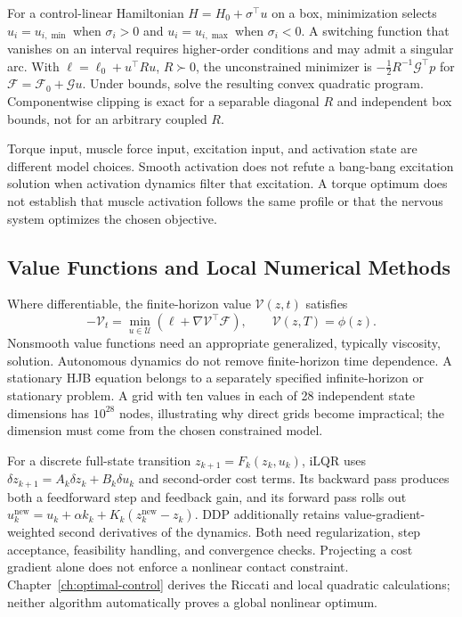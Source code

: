 For a control-linear Hamiltonian $H=H_0+\sigma^\top u$ on a box, minimization selects $u_i=u_{i,\min}$ when $\sigma_i>0$ and $u_i=u_{i,\max}$ when $\sigma_i<0$. A switching function that vanishes on an interval requires higher-order conditions and may admit a singular arc. With $\ell=\ell_0+u^\top Ru$, $R\succ0$, the unconstrained minimizer is $-\tfrac12R^{-1}\mathcal G^\top p$ for $\mathcal F=\mathcal F_0+\mathcal G u$. Under bounds, solve the resulting convex quadratic program. Componentwise clipping is exact for a separable diagonal $R$ and independent box bounds, not for an arbitrary coupled $R$.

Torque input, muscle force input, excitation input, and activation state are different model choices. Smooth activation does not refute a bang-bang excitation solution when activation dynamics filter that excitation. A torque optimum does not establish that muscle activation follows the same profile or that the nervous system optimizes the chosen objective.

\subsection{Value Functions and Local Numerical Methods}

Where differentiable, the finite-horizon value $\mathcal V(z,t)$ satisfies
\begin{equation}
 -\mathcal V_t=\min_{u\in\mathcal U}\left(\ell+\nabla\mathcal V^\top\mathcal F\right),\qquad
 \mathcal V(z,T)=\phi(z).
\end{equation}
Nonsmooth value functions need an appropriate generalized, typically viscosity, solution. Autonomous dynamics do not remove finite-horizon time dependence. A stationary HJB equation belongs to a separately specified infinite-horizon or stationary problem. A grid with ten values in each of 28 independent state dimensions has $10^{28}$ nodes, illustrating why direct grids become impractical; the dimension must come from the chosen constrained model.

For a discrete full-state transition $z_{k+1}=F_k(z_k,u_k)$, iLQR uses $\delta z_{k+1}=A_k\delta z_k+B_k\delta u_k$ and second-order cost terms. Its backward pass produces both a feedforward step and feedback gain, and its forward pass rolls out $u_k^{\mathrm{new}}=u_k+\alpha k_k+K_k(z_k^{\mathrm{new}}-z_k)$. DDP additionally retains value-gradient-weighted second derivatives of the dynamics. Both need regularization, step acceptance, feasibility handling, and convergence checks. Projecting a cost gradient alone does not enforce a nonlinear contact constraint. Chapter~\ref{ch:optimal-control} derives the Riccati and local quadratic calculations; neither algorithm automatically proves a global nonlinear optimum.

